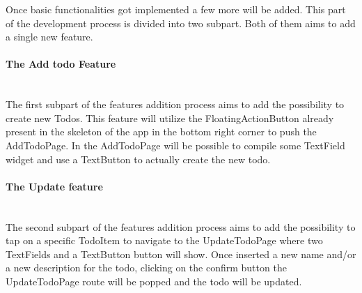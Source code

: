 

Once basic functionalities got implemented a few more will be added. This part of the development process is divided into two subpart. Both of them aims to add a single new feature.

\paragraph{The Add todo Feature} \mbox{} \\
\label{par:add_todo_feature_explanation}
 The first subpart of the features addition process aims to add the possibility to create new Todos. This feature will utilize the FloatingActionButton already present in the skeleton of the app in the bottom right corner to push the AddTodoPage. In the AddTodoPage will be possible to compile some TextField widget and use a TextButton to actually create the new todo.
 
 
\paragraph{The Update feature} \mbox{} \\
\label{par:update_todo_feature_explanation}
The second subpart of the features addition process aims to add the possibility to tap on a specific TodoItem to navigate to the UpdateTodoPage where two TextFields and a TextButton button will show. Once inserted a new name and/or a new description for the todo, clicking on the confirm button the UpdateTodoPage route will be popped and the todo will be updated. 